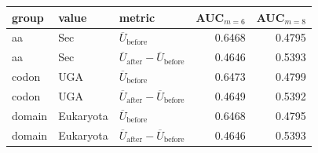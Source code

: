 \begingroup
{}
\small
\setlength{\tabcolsep}{6pt}
\renewcommand{\arraystretch}{1.15}
\setlength{\LTleft}{0pt}
\setlength{\LTright}{0pt}
\begin{longtable}{l l l r r}
\toprule
group & value & metric & AUC$_{m=6}$ & AUC$_{m=8}$ \\
\midrule
aa & Sec & $\overline{U}_{\mathrm{before}}$ & 0.6468 & 0.4795 \\
aa & Sec & $\overline{U}_{\mathrm{after}}-\overline{U}_{\mathrm{before}}$ & 0.4646 & 0.5393 \\
codon & UGA & $\overline{U}_{\mathrm{before}}$ & 0.6473 & 0.4799 \\
codon & UGA & $\overline{U}_{\mathrm{after}}-\overline{U}_{\mathrm{before}}$ & 0.4649 & 0.5392 \\
domain & Eukaryota & $\overline{U}_{\mathrm{before}}$ & 0.6468 & 0.4795 \\
domain & Eukaryota & $\overline{U}_{\mathrm{after}}-\overline{U}_{\mathrm{before}}$ & 0.4646 & 0.5393 \\
\bottomrule
\end{longtable}
\endgroup


